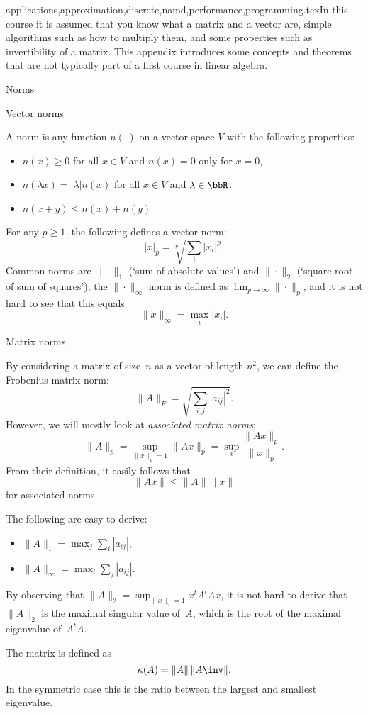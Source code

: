 {applications,approximation,discrete,namd,performance,programming}.texIn this course it is assumed that you know what a matrix and a vector
are, simple algorithms such as how to multiply them, and some
properties such as invertibility of a matrix. This appendix introduces
some concepts and theorems that are not typically part of a first
course in linear algebra.

 {Norms}

 {Vector norms}

A norm is any function $n(\cdot)$ on a vector space $V$ with the
following properties:
\begin{itemize}
\item $n(x)\geq0$ for all $x\in V$ and $n(x)=0$ only for $x=0$,
\item $n(\lambda x)=|\lambda|n(x)$ for all $x\in V$ and
  $\lambda\in\bbR$.
\item $n(x+y)\leq n(x)+n(y)$
\end{itemize}
For any $p\geq1$, the following defines a vector norm:
\[ |x|_p = \sqrt[p]{\sum_i|x_i|^p}. \]
Common norms are $\|\cdot\|_1$ (`sum of absolute values') and
$\|\cdot\|_2$ (`square root of sum of squares'); the
$\|\cdot\|_\infty$ norm is defined as
$\lim_{p\rightarrow\infty}\|\cdot\|_p$, and it is not hard to see that
this equals
\[ \|x\|_\infty=\max_i |x_i|. \]


 {Matrix norms}

By considering a matrix of size~$n$ as a vector of length $n^2$, we
can define the Frobenius matrix norm:
\[ \|A\|_F=\sqrt{\sum_{i,j}|a_{ij}|^2}. \]
However, we will mostly look at \emph{associated matrix
  norms}:
\[ \|A\|_p=\sup_{\|x\|_p=1}\|Ax\|_p=
   \sup_x\frac{\|Ax\|_p}{\|x\|_p}.
\]
From their definition, it easily follows that 
\[ \|Ax\|\leq\|A\|\|x\| \]
for associated norms.

The following are easy to derive:
\begin{itemize}
\item $\|A\|_1=\max_j\sum_i|a_{ij}|$,
\item $\|A\|_\infty=\max_i\sum_j|a_{ij}|$.
\end{itemize}
By observing that $\|A\|_2=\sup_{\|x\|_2=1} x^tA^tAx$, it is not hard
to derive that $\|A\|_2$ is the maximal singular value of~$A$, which
is the root of the maximal eigenvalue of~$A^tA$.

The matrix  is defined as
\[ \kappa(A)=\|A\|\,\|A\inv\|. \]
In the symmetric case this is the ratio between the largest and
smallest eigenvalue.

